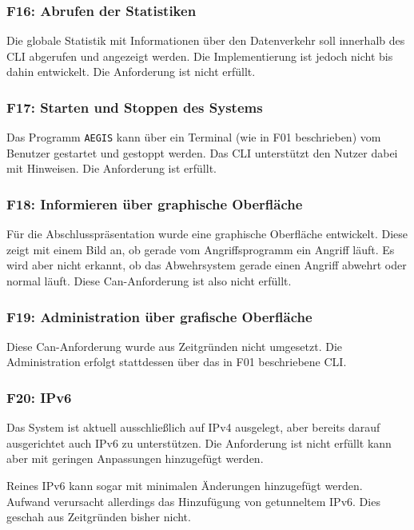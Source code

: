 \documentclass[../review_3.tex]{subfiles}
\begin{document}
\subsubsection{F16: Abrufen der Statistiken}
Die globale Statistik mit Informationen über den Datenverkehr soll innerhalb des CLI abgerufen und angezeigt werden. Die Implementierung ist jedoch nicht bis dahin entwickelt. Die Anforderung ist nicht erfüllt.

\subsubsection{F17: Starten und Stoppen des Systems}
Das Programm \texttt{AEGIS} kann über ein Terminal (wie in F01 beschrieben) vom Benutzer gestartet und gestoppt werden. Das CLI unterstützt den Nutzer dabei mit Hinweisen. Die Anforderung ist erfüllt.

\subsubsection{F18: Informieren über graphische Oberfläche}
Für die Abschlusspräsentation wurde eine graphische Oberfläche entwickelt. Diese zeigt mit einem Bild an, ob gerade vom Angriffsprogramm ein Angriff läuft. Es wird aber nicht erkannt, ob das Abwehrsystem gerade einen Angriff abwehrt oder normal läuft. Diese Can-Anforderung ist also nicht erfüllt.

\subsubsection{F19: Administration über grafische Oberfläche}
Diese Can-Anforderung wurde aus Zeitgründen nicht umgesetzt. Die Administration erfolgt stattdessen über das in F01 beschriebene CLI.

\subsubsection{F20: IPv6}
Das System ist aktuell ausschließlich auf IPv4 ausgelegt, aber bereits darauf ausgerichtet auch IPv6 zu unterstützen. Die Anforderung ist nicht erfüllt kann aber mit geringen Anpassungen hinzugefügt werden.

Reines IPv6 kann sogar mit minimalen Änderungen hinzugefügt werden. Aufwand verursacht allerdings das Hinzufügung von getunneltem IPv6.  Dies geschah aus Zeitgründen bisher nicht.
\end{document}
